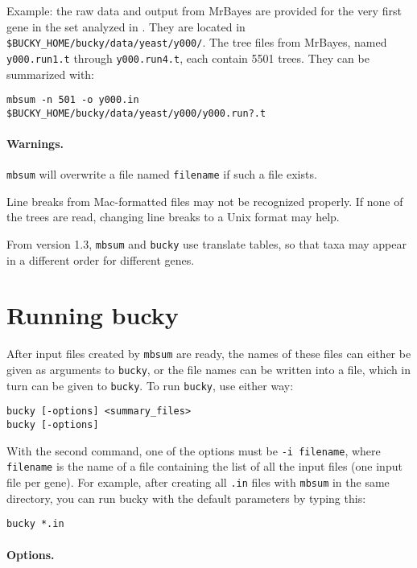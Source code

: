 \documentclass[12pt,english,final,letterpaper]{article}
\begin{document}
\noindent
Example: the raw data and output from MrBayes are provided for the
very first gene in the set analyzed in \cite{ane-etal-2008}.
They are located in \verb+$BUCKY_HOME/bucky/data/yeast/y000/+. 
The tree files from MrBayes, named \verb+y000.run1.t+ through
\verb+y000.run4.t+, each contain 5501 trees. 
They can be summarized with:
\begin{verbatim}
mbsum -n 501 -o y000.in    $BUCKY_HOME/bucky/data/yeast/y000/y000.run?.t
\end{verbatim}

\paragraph{Warnings.}  
{\tt mbsum} will overwrite a file named \verb+filename+
if such a file exists.

Line breaks from Mac-formatted files may not be recognized properly. 
If none of the trees are read, changing line breaks to a Unix format may help.

From version 1.3, \texttt{mbsum} and \texttt{bucky} use translate tables,
so that taxa may appear in a different order for different genes.



\section{Running bucky}
After input files created by {\tt mbsum} are ready, the names of these
files can either be given as arguments to {\tt bucky}, or the file 
names can be written into a file, which in turn can be given to
{\tt bucky}. To run {\tt bucky}, use either way:
\begin{verbatim}
bucky [-options] <summary_files> 
bucky [-options]
\end{verbatim}
With the second command, one of the options must be 
{\tt -i filename}, where {\tt filename} is the name of a file
containing the list of all the input files (one input file per gene).
For example, after creating all {\tt .in} files with {\tt mbsum} in the same 
directory, you can run bucky with the default parameters by typing this:
\begin{verbatim}
bucky *.in
\end{verbatim}

\paragraph{Options.} \hspace{1cm}
\end{document}
